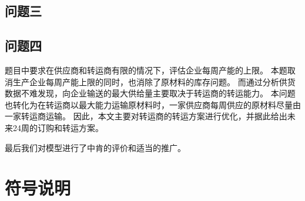 \subsection{问题三}



\subsection{问题四}
题目中要求在供应商和转运商有限的情况下，评估企业每周产能的上限。
本题取消生产企业每周产能上限的同时，也消除了原材料的库存问题。
而通过分析供货数据不难发现，向企业输送的最大供给量主要取决于转运商的转运能力。
本问题也转化为在转运商以最大能力运输原材料时，一家供应商每周供应的原材料尽量由一家转运商运输。
因此，本文主要对转运商的转运方案进行优化，并据此给出未来24周的订购和转运方案。

最后我们对模型进行了中肯的评价和适当的推广。

\section{符号说明} %
\label{sec:符号说明}

\begin{table}[!htbp]
\centering
\caption[文中符号所用说明]{文中符号所用说明}
\end{table}

